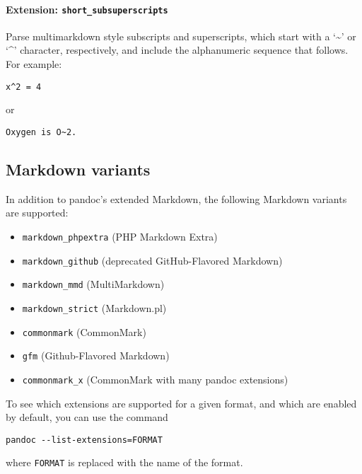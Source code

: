 \hypertarget{extension-short_subsuperscripts}{%
\paragraph{\texorpdfstring{Extension:
\texttt{short\_subsuperscripts}}{Extension: short\_subsuperscripts}}\label{extension-short_subsuperscripts}}

Parse multimarkdown style subscripts and superscripts, which start with
a `\textasciitilde{}' or `\^{}' character, respectively, and include the
alphanumeric sequence that follows. For example:

\begin{verbatim}
x^2 = 4
\end{verbatim}

or

\begin{verbatim}
Oxygen is O~2.
\end{verbatim}

\hypertarget{markdown-variants}{%
\subsection{Markdown variants}\label{markdown-variants}}

In addition to pandoc's extended Markdown, the following Markdown
variants are supported:

\begin{itemize}
\tightlist
\item
  \texttt{markdown\_phpextra} (PHP Markdown Extra)
\item
  \texttt{markdown\_github} (deprecated GitHub-Flavored Markdown)
\item
  \texttt{markdown\_mmd} (MultiMarkdown)
\item
  \texttt{markdown\_strict} (Markdown.pl)
\item
  \texttt{commonmark} (CommonMark)
\item
  \texttt{gfm} (Github-Flavored Markdown)
\item
  \texttt{commonmark\_x} (CommonMark with many pandoc extensions)
\end{itemize}

To see which extensions are supported for a given format, and which are
enabled by default, you can use the command

\begin{verbatim}
pandoc --list-extensions=FORMAT
\end{verbatim}

where \texttt{FORMAT} is replaced with the name of the format.

